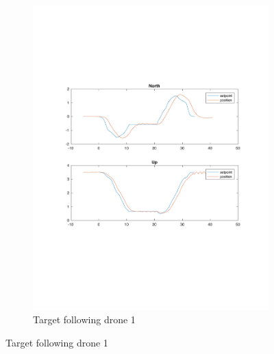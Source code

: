 \begin{figure}
\centering
   \begin{subfigure}[b]{0.8\textwidth}
   \includegraphics[width=1\linewidth]{chapters/chapter-04/figures/following_1_1.pdf}
   \caption{Target following drone 1}
   \label{fig:following_1_1}
\end{subfigure}


\end{figure}
